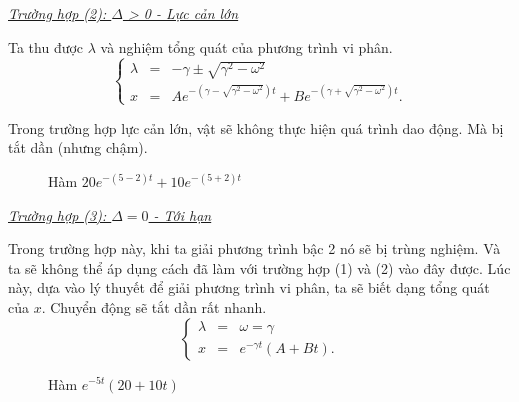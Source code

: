 \newpage
\vspace{2mm}

\underline{\textit{Trường hợp (2): \(\Delta\) > 0 - Lực cản lớn}}

Ta thu được \(\lambda\) và nghiệm tổng quát của phương trình vi phân.
\begin{equation}
    \left\{
    \begin{array}{ccc}
    \lambda &=& - \gamma \pm   \sqrt{\gamma^2 - \omega^2} \\
    x &=& A e^{- \left( \gamma - \sqrt{\gamma^2 - \omega^2}\right)  t} + B e^{- \left( \gamma + \sqrt{\gamma^2 - \omega^2}\right) t}.
    \end{array}
    \right.
    \label{eq:1.13}
\end{equation}

Trong trường hợp lực cản lớn, vật sẽ không thực hiện quá trình dao động. Mà bị tắt dần (nhưng chậm).

\begin{figure}[!htb]
    \centering
    \caption{Hàm \(20 e^{-(5-2)t} + 10 e^{-(5+2)t}\)}
    \label{fig:1.7}
\end{figure}
\vspace{2mm}

\underline{\textit{Trường hợp (3): \(\Delta = 0\) - Tới hạn}}

Trong trường hợp này, khi ta giải phương trình bậc 2 nó sẽ bị trùng nghiệm. Và ta sẽ không thể áp dụng cách đã làm với trường hợp (1) và (2) vào đây được. Lúc này, dựa vào lý thuyết để giải phương trình vi phân, ta sẽ biết dạng tổng quát của \(x\). Chuyển động sẽ tắt dần rất nhanh. 
\begin{equation}
    \left\{
    \begin{array}{ccc}
    \lambda &=& \omega = \gamma \\
    x &=& e^{-\gamma t} \left( A + B t\right).
    \end{array}
    \right.
    \label{eq:1.14}
\end{equation}

\begin{figure}[!htb]
    \centering
    \caption{Hàm \(e^{-5t} \left(20 + 10t\right)\)}
    \label{fig:1.8}
\end{figure}
\vspace{2mm}

